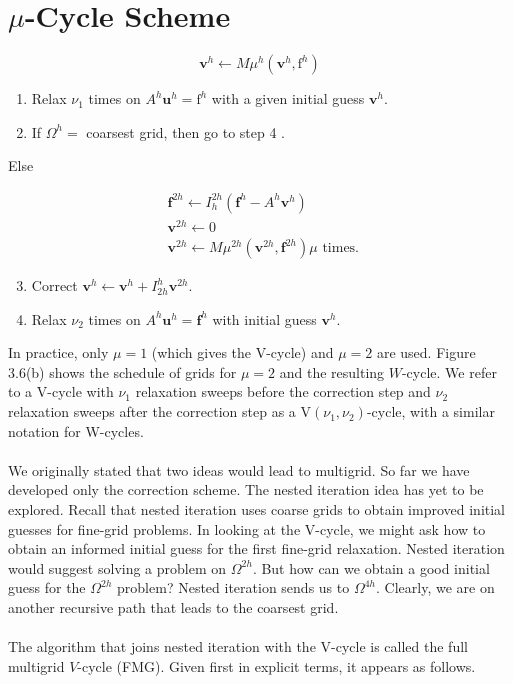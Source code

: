 \documentclass[11pt]{book}
\begin{document}
\section*{$\mu$-Cycle Scheme}
$$
\mathbf{v}^{h} \leftarrow M \mu^{h}\left(\mathbf{v}^{h}, \mathrm{f}^{h}\right)
$$

\begin{enumerate}
  \item Relax $\nu_{1}$ times on $A^{h} \mathbf{u}^{h}=\mathrm{f}^{h}$ with a given initial guess $\mathbf{v}^{h}$.

  \item If $\Omega^{h}=$ coarsest grid, then go to step 4 .

\end{enumerate}

Else

$$
\begin{aligned}
& \mathbf{f}^{2 h} \leftarrow I_{h}^{2 h}\left(\mathbf{f}^{h}-A^{h} \mathbf{v}^{h}\right) \\
& \mathbf{v}^{2 h} \leftarrow 0 \\
& \mathbf{v}^{2 h} \leftarrow M \mu^{2 h}\left(\mathbf{v}^{2 h}, \mathbf{f}^{2 h}\right) \mu \text { times. }
\end{aligned}
$$

\begin{enumerate}
  \setcounter{enumi}{2}
  \item Correct $\mathbf{v}^{h} \leftarrow \mathbf{v}^{h}+I_{2 h}^{h} \mathbf{v}^{2 h}$.

  \item Relax $\nu_{2}$ times on $A^{h} \mathbf{u}^{h}=\mathbf{f}^{h}$ with initial guess $\mathbf{v}^{h}$.

\end{enumerate}
In practice, only $\mu=1$ (which gives the V-cycle) and $\mu=2$ are used. Figure 3.6(b) shows the schedule of grids for $\mu=2$ and the resulting $W$-cycle. We refer to a $\mathrm{V}$-cycle with $\nu_{1}$ relaxation sweeps before the correction step and $\nu_{2}$ relaxation sweeps after the correction step as a $\mathrm{V}\left(\nu_{1}, \nu_{2}\right)$-cycle, with a similar notation for W-cycles. \\ \\
We originally stated that two ideas would lead to multigrid. So far we have developed only the correction scheme. The nested iteration idea has yet to be explored. Recall that nested iteration uses coarse grids to obtain improved initial guesses for fine-grid problems. In looking at the V-cycle, we might ask how to obtain an informed initial guess for the first fine-grid relaxation. Nested iteration would suggest solving a problem on $\Omega^{2 h}$. But how can we obtain a good initial guess for the $\Omega^{2 h}$ problem? Nested iteration sends us to $\Omega^{4 h}$. Clearly, we are on another recursive path that leads to the coarsest grid. \\ \\         
The algorithm that joins nested iteration with the V-cycle is called the full multigrid $V$-cycle (FMG). Given first in explicit terms, it appears as follows.
\end{document}
